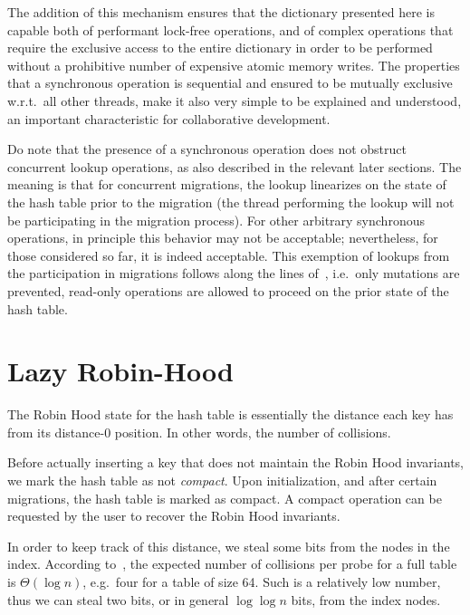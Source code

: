 The addition of this mechanism ensures that the dictionary presented here is capable both of performant lock-free operations, and of complex operations that require the exclusive access to the entire dictionary in order to be performed without a prohibitive number of expensive atomic memory writes.
The properties that a synchronous operation is sequential and ensured to be mutually exclusive w.r.t.\ all other threads, make it also very simple to be explained and understood, an important characteristic for collaborative development.

Do note that the presence of a synchronous operation does not obstruct concurrent lookup operations, as also described in the relevant later sections.
The meaning is that for concurrent migrations, the lookup linearizes on the state of the hash table prior to the migration (the thread performing the lookup will not be participating in the migration process).
For other arbitrary synchronous operations, in principle this behavior may not be acceptable; nevertheless, for those considered so far, it is indeed acceptable.
This exemption of lookups from the participation in migrations follows along the lines of~\cite[\S5.3.2, Preventing Concurrent Updates to Ensure Consistency]{maier}, i.e.\ only mutations are prevented, read-only operations are allowed to proceed on the prior state of the hash table.


\section{Lazy Robin-Hood}\label{sec:lazy-robin-hood}

The Robin Hood state for the hash table is essentially the distance each key has from its distance-0 position.
In other words, the number of collisions.

Before actually inserting a key that does not maintain the Robin Hood invariants, we mark the hash table as not \emph{compact}.
Upon initialization, and after certain migrations, the hash table is marked as compact.
A compact operation can be requested by the user to recover the Robin Hood invariants.

In order to keep track of this distance, we steal some bits from the nodes in the index.
According to~\cite[Corollary to Theorem~3]{robin-hood}, the expected number of collisions per probe for a full table is $\Theta(\log n)$, e.g.\ four for a table of size 64.
Such is a relatively low number, thus we can steal two bits, or in general $\log \log n$ bits, from the index nodes.

